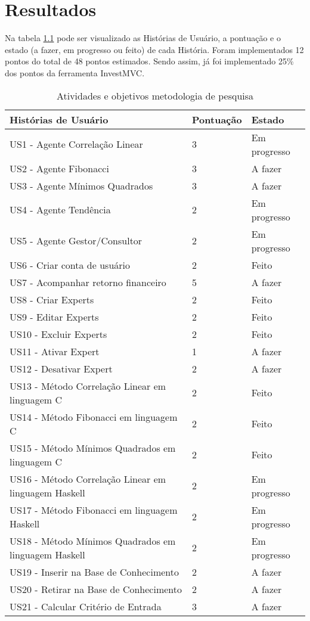 \chapter{Resultados}

Na tabela \ref{estadoAtual} pode ser visualizado as Histórias de Usuário, a pontuação e o estado (a fazer, em progresso ou feito) de cada História. Foram implementados 12 pontos do total de 48 pontos estimados. Sendo assim, já foi implementado 25\% dos pontos da ferramenta InvestMVC.

\begin{table}[htp]
\caption{Atividades e objetivos metodologia de pesquisa}
\begin{center}
    \begin{tabular}{ | p{5cm} | p{4cm} | p{4cm}|}
    \hline
    \textbf{Histórias de Usuário} & \textbf{Pontuação} & \textbf{Estado} \\ \hline

US1 - Agente Correlação Linear & 3 & Em progresso\\ \hline
US2 - Agente Fibonacci & 3 & A fazer \\ \hline
US3 - Agente Mínimos Quadrados & 3 & A fazer\\ \hline
US4 -  Agente Tendência & 2 & Em progresso\\ \hline
US5 - Agente Gestor/Consultor & 2& Em progresso\\ \hline
US6 - Criar conta de usuário & 2 & Feito\\ \hline
US7 - Acompanhar retorno financeiro & 5 & A fazer\\ \hline
US8 - Criar Experts & 2 & Feito\\ \hline
US9 - Editar Experts & 2 & Feito\\ \hline
US10 - Excluir Experts & 2 & Feito\\ \hline
US11 - Ativar Expert & 1 & A fazer\\ \hline
US12 - Desativar Expert & 2 & A fazer \\ \hline
US13 - Método Correlação Linear em linguagem C & 2 & Feito\\ \hline
US14 - Método Fibonacci em linguagem C & 2 & Feito\\ \hline
US15 - Método Mínimos Quadrados em linguagem C & 2 & Feito\\ \hline
US16 - Método Correlação Linear em linguagem Haskell & 2 & Em progresso\\ \hline
US17 - Método Fibonacci em linguagem Haskell & 2 & Em progresso\\ \hline
US18 - Método Mínimos Quadrados em linguagem Haskell & 2 & Em progresso\\ \hline
US19 - Inserir na Base de Conhecimento & 2 & A fazer\\ \hline
US20 - Retirar na Base de Conhecimento & 2 & A fazer\\ \hline
US21 - Calcular Critério de Entrada & 3 & A fazer\\ \hline
\end{tabular}
\end{center}
\label{estadoAtual}
\end{table}

